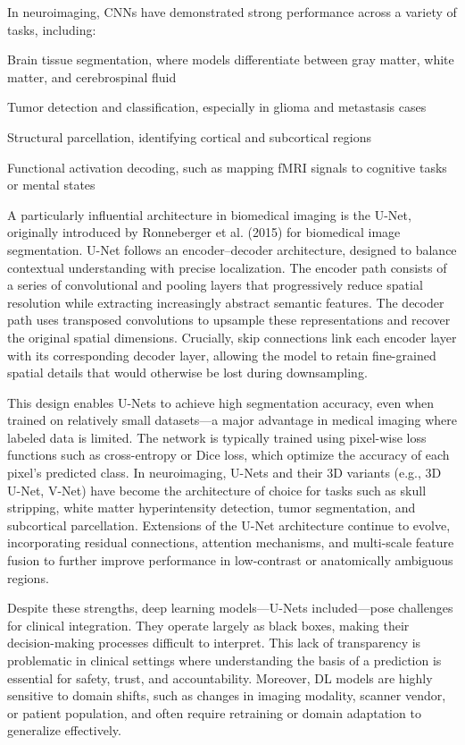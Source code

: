 In neuroimaging, CNNs have demonstrated strong performance across a variety of tasks, including:

Brain tissue segmentation, where models differentiate between gray matter, white matter, and cerebrospinal fluid

Tumor detection and classification, especially in glioma and metastasis cases

Structural parcellation, identifying cortical and subcortical regions

Functional activation decoding, such as mapping fMRI signals to cognitive tasks or mental states

A particularly influential architecture in biomedical imaging is the U-Net, originally introduced by Ronneberger et al. (2015) for biomedical image segmentation. U-Net follows an encoder–decoder architecture, designed to balance contextual understanding with precise localization. The encoder path consists of a series of convolutional and pooling layers that progressively reduce spatial resolution while extracting increasingly abstract semantic features. The decoder path uses transposed convolutions to upsample these representations and recover the original spatial dimensions. Crucially, skip connections link each encoder layer with its corresponding decoder layer, allowing the model to retain fine-grained spatial details that would otherwise be lost during downsampling.

This design enables U-Nets to achieve high segmentation accuracy, even when trained on relatively small datasets—a major advantage in medical imaging where labeled data is limited. The network is typically trained using pixel-wise loss functions such as cross-entropy or Dice loss, which optimize the accuracy of each pixel’s predicted class. In neuroimaging, U-Nets and their 3D variants (e.g., 3D U-Net, V-Net) have become the architecture of choice for tasks such as skull stripping, white matter hyperintensity detection, tumor segmentation, and subcortical parcellation. Extensions of the U-Net architecture continue to evolve, incorporating residual connections, attention mechanisms, and multi-scale feature fusion to further improve performance in low-contrast or anatomically ambiguous regions.

Despite these strengths, deep learning models—U-Nets included—pose challenges for clinical integration. They operate largely as black boxes, making their decision-making processes difficult to interpret. This lack of transparency is problematic in clinical settings where understanding the basis of a prediction is essential for safety, trust, and accountability. Moreover, DL models are highly sensitive to domain shifts, such as changes in imaging modality, scanner vendor, or patient population, and often require retraining or domain adaptation to generalize effectively.


